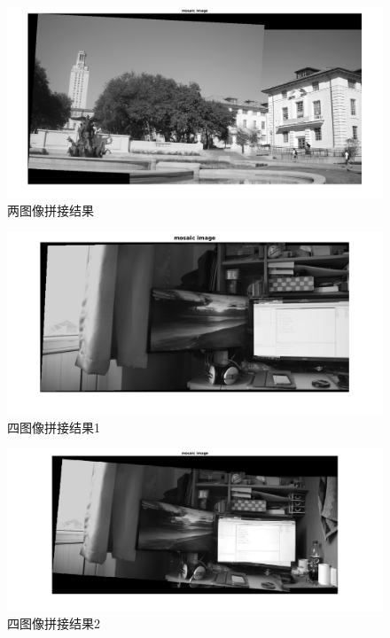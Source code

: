 \documentclass[a4paper, UTF8]{ctexrep}
\begin{document}
		\clearpage
		\begin{figure}[htbp!]
			\centering
			\includegraphics[width = \textwidth]{hw2_fig5.png}
			\caption{两图像拼接结果}
			\label{fig:figure1}
		\end{figure}
		\begin{figure}[htbp!]
			\centering
			\includegraphics[width = \textwidth]{hw2_fig6.png}
			\caption{四图像拼接结果1}
			\label{fig:figure1}
		\end{figure}
		\clearpage
		\begin{figure}[htbp!]
			\centering
			\includegraphics[width = \textwidth]{hw2_fig7.png}
			\caption{四图像拼接结果2}
			\label{fig:figure1}
		\end{figure}
\end{document}
